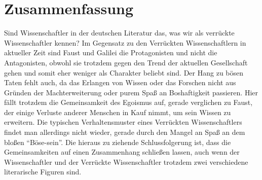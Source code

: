 \documentclass[12pt]{scrreprt}
\begin{document}
\chapter{Zusammenfassung}
	\label{chap:zusammenfassung}
Sind Wissenschaftler in der deutschen Literatur das, was wir als verrückte Wissenschaftler kennen?
Im Gegensatz zu den Verrückten Wissenschaftlern in aktueller Zeit sind Faust und Galilei die Protagonisten und nicht die Antagonisten, obwohl sie trotzdem gegen den Trend der aktuellen Gesellschaft gehen und somit eher weniger als Charakter beliebt sind.
Der Hang zu bösen Taten fehlt auch, da das Erlangen von Wissen oder das Forschen nicht aus Gründen der Machterweiterung oder purem Spaß an Boshaftigkeit passieren.
Hier fällt trotzdem die Gemeinsamkeit des Egoismus auf, gerade verglichen zu Faust, der einige Verluste anderer Menschen in Kauf nimmt, um sein Wissen zu erweitern.
Die typischen Verhaltensmuster eines Verrückten Wissenschaftlers findet man allerdings nicht wieder, gerade durch den Mangel an Spaß an dem bloßen \enquote{Böse-sein}.
Die hieraus zu ziehende Schlussfolgerung ist, dass die Gemeinsamkeiten auf einen Zusammenhang schließen lassen, auch wenn der Wissenschaftler und der Verrückte Wissenschaftler trotzdem zwei verschiedene literarische Figuren sind.

\printbibliography
\end{document}
